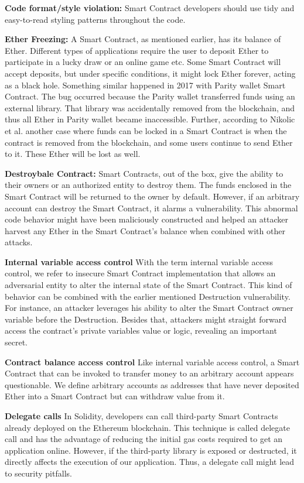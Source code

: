 \documentclass[a4paper,11pt]{article}
\begin{document}
\textbf{Code format/style violation:}
Smart Contract developers should use tidy and easy-to-read styling patterns
throughout the code.

\textbf{Ether Freezing:}
A Smart Contract, as mentioned earlier, has its balance of Ether. Different
types of applications require the user to deposit Ether to participate in a
lucky draw or an online game etc. Some Smart Contract will accept deposits, but
under specific conditions, it might lock Ether forever, acting as a black hole.
Something similar happened in 2017 with Parity wallet Smart Contract. The bug
occurred because the Parity wallet transferred funds using an external library.
That library was accidentally removed from the blockchain, and thus all Ether in
Parity wallet became inaccessible. Further, according to Nikolic et al. another
case where funds can be locked in a Smart Contract is when the contract is
removed from the blockchain, and some users continue to send Ether to it. These
Ether will be lost as well.

\textbf{Destroybale Contract:}
Smart Contracts, out of the box, give the ability to their owners or an
authorized entity to destroy them. The funds enclosed in the Smart Contract will
be returned to the owner by default. However, if an arbitrary account can
destroy the Smart Contract, it alarms a vulnerability. This abnormal code
behavior might have been maliciously constructed and helped an attacker harvest
any Ether in the Smart Contract's balance when combined with other attacks.

\textbf{Internal variable access control}
With the term internal variable access control, we refer to insecure Smart
Contract implementation that allows an adversarial entity to alter the internal
state of the Smart Contract. This kind of behavior can be combined with the
earlier mentioned Destruction vulnerability. For instance, an attacker leverages
his ability to alter the Smart Contract owner variable before the Destruction.
Besides that, attackers might straight forward access the contract's private
variables value or logic, revealing an important secret. 

\textbf{Contract balance access control}
Like internal variable access control, a Smart Contract that can be invoked to
transfer money to an arbitrary account appears questionable. We define arbitrary
accounts as addresses that have never deposited Ether into a Smart Contract but
can withdraw value from it. 

\textbf{Delegate calls}
In Solidity, developers can call third-party Smart Contracts already deployed on
the Ethereum blockchain. This technique is called delegate call and has the
advantage of reducing the initial gas costs required to get an application
online. However, if the third-party library is exposed or destructed, it
directly affects the execution of our application. Thus, a delegate call might
lead to security pitfalls.
\end{document}

